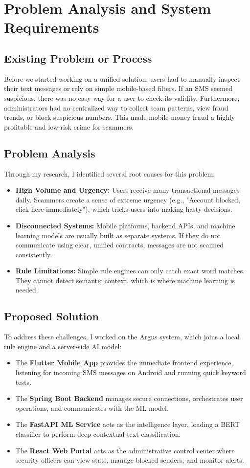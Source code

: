 \chapter{Problem Analysis and System Requirements}
\label{ch:requirements}

\section{Existing Problem or Process}
Before we started working on a unified solution, users had to manually inspect their text messages or rely on simple mobile-based filters. If an SMS seemed suspicious, there was no easy way for a user to check its validity. Furthermore, administrators had no centralized way to collect scam patterns, view fraud trends, or block suspicious numbers. This made mobile-money fraud a highly profitable and low-risk crime for scammers.

\section{Problem Analysis}
Through my research, I identified several root causes for this problem:
\begin{itemize}
  \item \textbf{High Volume and Urgency:} Users receive many transactional messages daily. Scammers create a sense of extreme urgency (e.g., "Account blocked, click here immediately"), which tricks users into making hasty decisions.
  \item \textbf{Disconnected Systems:} Mobile platforms, backend APIs, and machine learning models are usually built as separate systems. If they do not communicate using clear, unified contracts, messages are not scanned consistently.
  \item \textbf{Rule Limitations:} Simple rule engines can only catch exact word matches. They cannot detect semantic context, which is where machine learning is needed.
\end{itemize}

\section{Proposed Solution}
To address these challenges, I worked on the Argus system, which joins a local rule engine and a server-side AI model:
\begin{itemize}
  \item The \textbf{Flutter Mobile App} provides the immediate frontend experience, listening for incoming SMS messages on Android and running quick keyword tests.
  \item The \textbf{Spring Boot Backend} manages secure connections, orchestrates user operations, and communicates with the ML model.
  \item The \textbf{FastAPI ML Service} acts as the intelligence layer, loading a BERT classifier to perform deep contextual text classification.
  \item The \textbf{React Web Portal} acts as the administrative control center where security officers can view stats, manage blocked senders, and monitor alerts.
\end{itemize}

